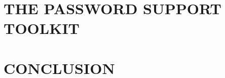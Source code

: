 \documentclass[12pt,a4paper]{book}
\begin{document}
\part{THE PASSWORD SUPPORT TOOLKIT}


%
%

\part{CONCLUSION}





\cleardoublepage


\backmatter


\printglossaries


%



\cleardoublepage
\end{document}

